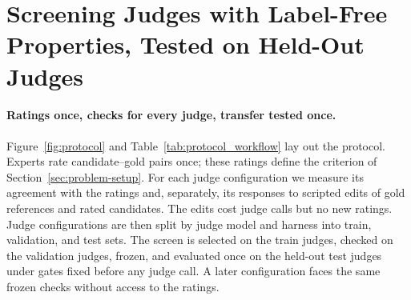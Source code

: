\section{Screening Judges with Label-Free Properties, Tested on Held-Out Judges}\label{sec:property-protocol}
\paragraph{Ratings once, checks for every judge, transfer tested once.}
Figure~\ref{fig:protocol} and Table~\ref{tab:protocol_workflow} lay out the protocol.
Experts rate candidate--gold pairs once; these ratings define the criterion of Section~\ref{sec:problem-setup}.
For each judge configuration we measure its agreement with the ratings and, separately, its responses to scripted edits of gold references and rated candidates.
The edits cost judge calls but no new ratings.
Judge configurations are then split by judge model and harness into train, validation, and test sets.
The screen is selected on the train judges, checked on the validation judges, frozen, and evaluated once on the held-out test judges under gates fixed before any judge call.
A later configuration faces the same frozen checks without access to the ratings.

